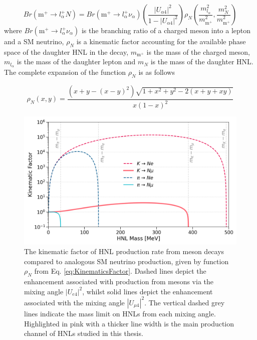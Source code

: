 \begin{equation}
	Br(\text{m}^{+}\rightarrow l^{+}_{\alpha}N) = Br(\text{m}^{+}\rightarrow l^{+}_{\alpha}\nu_{\alpha})\left(\frac{|U_{\alpha 4}|^{2}}{1 - |U_{\alpha 4}|^{2}}\right)\rho_{N}\left(\frac{m^{2}_{l_{\alpha}}}{m^{2}_{\text{m}^{+}}}, \frac{m^{2}_{N}}{m^{2}_{\text{m}^{+}}} \right) 
\end{equation}
where $Br(\text{m}^{+}\rightarrow l^{+}_{\alpha}\nu_{\alpha})$ is the branching ratio of a charged meson into a lepton and a SM neutrino, $\rho_{N}$ is a kinematic factor accounting for the available phase space of the daughter HNL in the decay, $m_{\text{m}^{+}}$ is the mass of the charged meson, $m_{l_{\alpha}}$ is the mass of the daughter lepton and $m_{N}$ is the mass of the daughter HNL.
The complete expansion of the function $\rho_{N}$ is as follows \cite{HNLKelly}

\begin{equation}
	\rho_{N}(x,y) = \frac{(x+y-(x-y)^{2})\sqrt{1+x^{2}+y^{2}-2(x+y+xy)}}{x(1-x)^{2}}
\label{eq:KinematicsFactor}
\end{equation}

\begin{figure}[t] 
\centering    
\includegraphics[width=1.0\textwidth]{kinematics_factor}
\caption[KinematicsFactor]{
The kinematic factor of HNL production rate from meson decays compared to analogous SM neutrino production, given by function $\rho_{N}$ from Eq. \ref{eq:KinematicsFactor}.
Dashed lines depict the enhancement associated with production from mesons via the mixing angle $|U_{e4}|^{2}$, whilst solid lines depict the enhancement associated with the mixing angle $|U_{\mu4}|^{2}$.
The vertical dashed grey lines indicate the mass limit on HNLs from each mixing angle.
Highlighted in pink with a thicker line width is the main production channel of HNLs studied in this thesis.
}
\label{fig:KinematicsFactor}
\end{figure}

